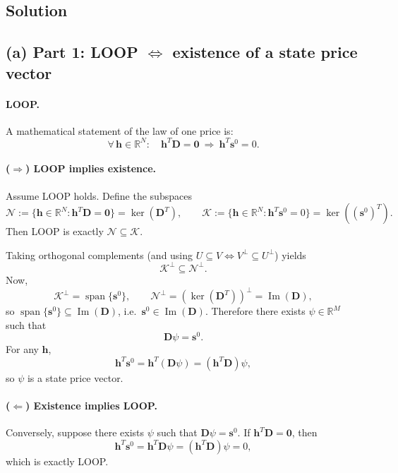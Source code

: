 \documentclass{article}
\begin{document}
\bigskip

\subsection*{Solution}

\subsection*{(a) Part 1: LOOP $\Leftrightarrow$ existence of a state price vector}

\paragraph{LOOP.}
A mathematical statement of the law of one price is:
\[
\forall\,\mathbf{h}\in\mathbb{R}^N:\quad
\mathbf{h}^T\mathbf{D}=\mathbf{0}\ \Rightarrow\ \mathbf{h}^T\mathbf{s}^0=0.
\]

\paragraph{($\Rightarrow$) LOOP implies existence.}
Assume LOOP holds. Define the subspaces
\[
\mathcal{N}:=\{\mathbf{h}\in\mathbb{R}^N:\mathbf{h}^T\mathbf{D}=\mathbf{0}\}
=\ker(\mathbf{D}^T),
\qquad
\mathcal{K}:=\{\mathbf{h}\in\mathbb{R}^N:\mathbf{h}^T\mathbf{s}^0=0\}
=\ker((\mathbf{s}^0)^T).
\]
Then LOOP is exactly $\mathcal{N}\subseteq\mathcal{K}$.

Taking orthogonal complements (and using $U\subseteq V\iff V^\perp\subseteq U^\perp$) yields
\[
\mathcal{K}^\perp\subseteq\mathcal{N}^\perp.
\]
Now,
\[
\mathcal{K}^\perp=\operatorname{span}\{\mathbf{s}^0\},
\qquad
\mathcal{N}^\perp=(\ker(\mathbf{D}^T))^\perp=\operatorname{Im}(\mathbf{D}),
\]
so $\operatorname{span}\{\mathbf{s}^0\}\subseteq\operatorname{Im}(\mathbf{D})$, i.e.\ $\mathbf{s}^0\in\operatorname{Im}(\mathbf{D})$.
Therefore there exists $\psi\in\mathbb{R}^M$ such that
\[
\mathbf{D}\psi=\mathbf{s}^0.
\]
For any $\mathbf{h}$,
\[
\mathbf{h}^T\mathbf{s}^0=\mathbf{h}^T(\mathbf{D}\psi)=(\mathbf{h}^T\mathbf{D})\psi,
\]
so $\psi$ is a state price vector.

\paragraph{($\Leftarrow$) Existence implies LOOP.}
Conversely, suppose there exists $\psi$ such that $\mathbf{D}\psi=\mathbf{s}^0$.
If $\mathbf{h}^T\mathbf{D}=\mathbf{0}$, then
\[
\mathbf{h}^T\mathbf{s}^0
=\mathbf{h}^T\mathbf{D}\psi
=(\mathbf{h}^T\mathbf{D})\psi
=0,
\]
which is exactly LOOP.
\end{document}
